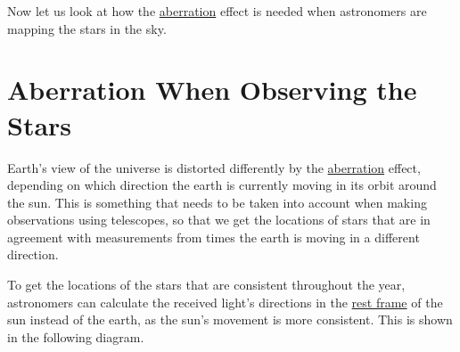 Now let us look at how the \hyperlink{def-aberration}{aberration} effect is needed when astronomers are mapping the stars in the sky.

\section{Aberration When Observing the Stars}\label{sect: Aberration When Observing the Stars}

Earth's view of the universe is distorted differently by the \hyperlink{def-aberration}{aberration} effect, depending on which direction the earth is currently moving in its orbit around the sun.
This is something that needs to be taken into account when making observations using telescopes, so that we get the locations of stars that are in agreement with measurements from times the earth is moving in a different direction.

To get the locations of the stars that are consistent throughout the year, astronomers can calculate the received light's directions in the \hyperlink{def-proper-frame}{rest frame} of the sun instead of the earth, as the sun's movement is more consistent.
This is shown in the following diagram.

